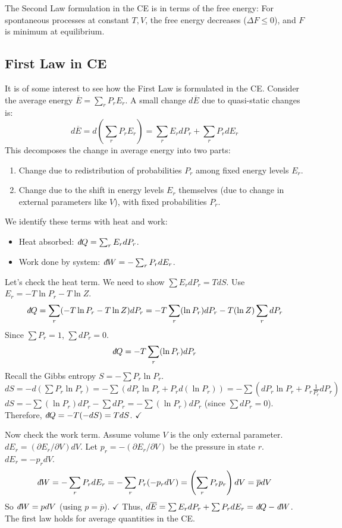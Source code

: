 \documentclass[11pt]{article}
\newcommand{\avg}[1]{\overline{#1}}
\newcommand{\ethbar}{\text{\it{đ}}} %
\begin{document}
The Second Law formulation in the CE is in terms of the free energy: For spontaneous processes at constant $T, V$, the free energy decreases ($\Delta F \le 0$), and $F$ is minimum at equilibrium.

\subsection*{First Law in CE}

It is of some interest to see how the First Law is formulated in the CE.
Consider the average energy $\avg{E} = \sum_r P_r E_r$. A small change $d\avg{E}$ due to quasi-static changes is:
\[ d\avg{E} = d \left( \sum_r P_r E_r \right) = \sum_r E_r dP_r + \sum_r P_r dE_r \]
This decomposes the change in average energy into two parts:
\begin{enumerate}
    \item Change due to redistribution of probabilities $P_r$ among fixed energy levels $E_r$.
    \item Change due to the shift in energy levels $E_r$ themselves (due to change in external parameters like $V$), with fixed probabilities $P_r$.
\end{enumerate}
We identify these terms with heat and work:
\begin{itemize}
    \item Heat absorbed: $\ethbar Q = \sum_r E_r dP_r$.
    \item Work done by system: $\ethbar W = -\sum_r P_r dE_r$.
\end{itemize}
Let's check the heat term. We need to show $\sum E_r dP_r = T dS$.
Use $E_r = -T \ln P_r - T \ln Z$.
\[ \ethbar Q = \sum_r (-T \ln P_r - T \ln Z) dP_r = -T \sum_r (\ln P_r) dP_r - T (\ln Z) \sum_r dP_r \]
Since $\sum P_r = 1$, $\sum dP_r = 0$.
\[ \ethbar Q = -T \sum_r (\ln P_r) dP_r \]
Recall the Gibbs entropy $S = -\sum P_r \ln P_r$.
$dS = -d(\sum P_r \ln P_r) = - \sum (dP_r \ln P_r + P_r d(\ln P_r)) = - \sum (dP_r \ln P_r + P_r \frac{1}{P_r} dP_r)$
$dS = - \sum (\ln P_r) dP_r - \sum dP_r = - \sum (\ln P_r) dP_r$ (since $\sum dP_r = 0$).
Therefore, $\ethbar Q = -T (-dS) = T dS$. $\checkmark$

Now check the work term. Assume volume $V$ is the only external parameter. $dE_r = (\partial E_r / \partial V) dV$. Let $p_r = -(\partial E_r / \partial V)$ be the pressure in state $r$. $dE_r = -p_r dV$.
\[ \ethbar W = -\sum_r P_r dE_r = -\sum_r P_r (-p_r dV) = \left( \sum_r P_r p_r \right) dV = \avg{p} dV \]
So $\ethbar W = p dV$ (using $p=\avg{p}$). $\checkmark$
Thus, $d\avg{E} = \sum E_r dP_r + \sum P_r dE_r = \ethbar Q - \ethbar W$. The first law holds for average quantities in the CE.
\end{document}
